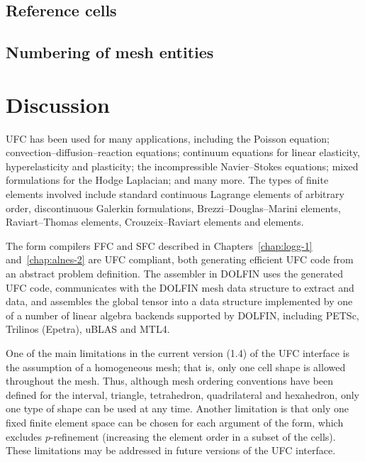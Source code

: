 \subsection{Reference cells}



\subsection{Numbering of mesh entities}



\section{Discussion}

UFC has been used for many applications, including the Poisson
equation; convection--diffusion--reaction equations; continuum
equations for linear elasticity, hyperelasticity and plasticity; the
incompressible Navier--Stokes equations; mixed formulations for the
Hodge Laplacian; and many more. The types of finite elements involved
include standard continuous Lagrange elements of arbitrary order,
discontinuous Galerkin formulations, Brezzi--Douglas--Marini elements,
Raviart--Thomas elements, Crouzeix--Raviart elements and \nedelec{}
elements.

The form compilers FFC and SFC described in Chapters~\ref{chap:logg-1}
and~\ref{chap:alnes-2} are UFC compliant, both generating efficient
UFC code from an abstract problem definition. The assembler in DOLFIN
uses the generated UFC code, communicates with the DOLFIN mesh data
structure to extract  and  data, and
assembles the global tensor into a data structure implemented by one
of a number of linear algebra backends supported by DOLFIN, including
PETSc, Trilinos (Epetra), uBLAS and MTL4.

One of the main limitations in the current version (1.4) of the UFC
interface is the assumption of a homogeneous mesh; that is, only one
cell shape is allowed throughout the mesh. Thus, although mesh
ordering conventions have been defined for the interval, triangle,
tetrahedron, quadrilateral and hexahedron, only one type of shape can
be used at any time. Another limitation is that only one fixed finite
element space can be chosen for each argument of the form, which
excludes $p$-refinement (increasing the element order in a subset of
the cells). These limitations may be addressed in future versions of
the UFC interface.

